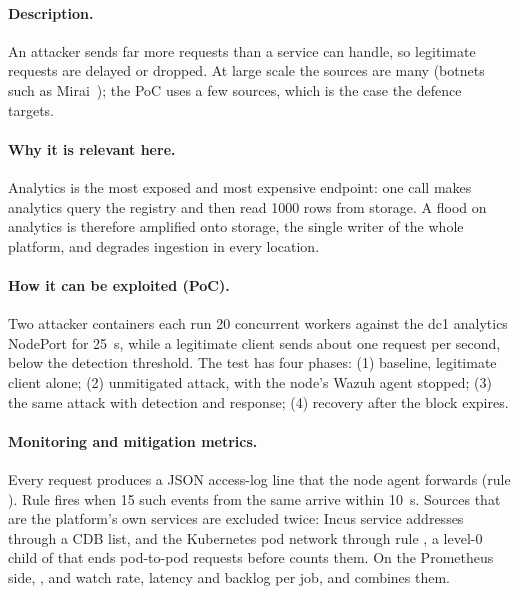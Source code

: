 \paragraph{Description.}
An attacker sends far more requests than a service can handle, so legitimate requests are delayed
or dropped. At large scale the sources are many (botnets such as Mirai~\cite{antonakakis2017mirai});
the PoC uses a few sources, which is the case the defence targets.

\paragraph{Why it is relevant here.}
Analytics is the most exposed and most expensive endpoint: one  call makes
analytics query the registry and then read 1000 rows from storage. A flood on analytics is
therefore amplified onto storage, the single writer of the whole platform, and degrades ingestion
in every location.

\paragraph{How it can be exploited (PoC).}
Two attacker containers each run 20 concurrent workers against the dc1 analytics NodePort for
25~s, while a legitimate client sends about one request per second, below the detection threshold.
The test has four phases: (1) baseline, legitimate client alone; (2) unmitigated attack, with the
node's Wazuh agent stopped; (3) the same attack with detection and response; (4) recovery after the
block expires.

\paragraph{Monitoring and mitigation metrics.}
Every request produces a JSON access-log line that the node agent forwards (rule ).
Rule  fires when 15 such events from the same  arrive within 10~s.
Sources that are the platform's own services are excluded twice: Incus service addresses through
a CDB list, and the Kubernetes pod network through rule , a level-0 child of
 that ends pod-to-pod requests before  counts them. On the Prometheus side,
,  and  watch
rate, latency and backlog per job, and  combines them.

